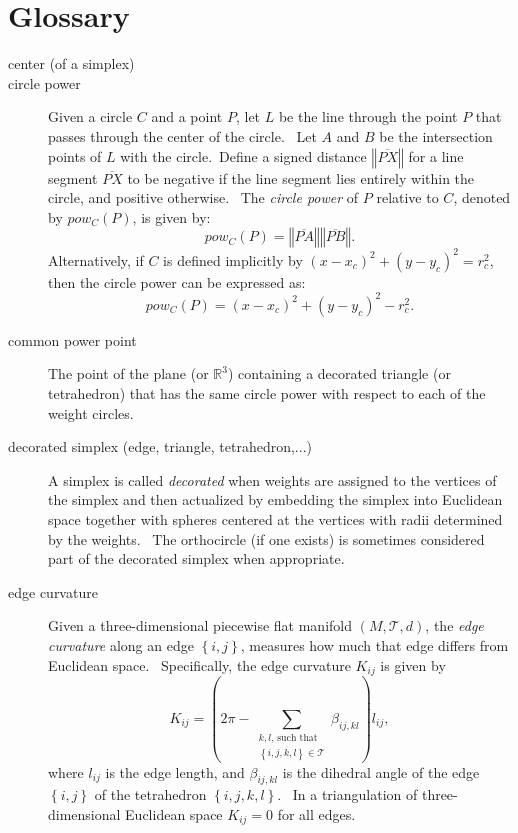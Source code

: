                       


\chapter{Glossary}

\begin{description}
\item[center (of a simplex)] 

\item[circle power] Given a circle $C$ and a point $P$, let $L$ be the line
through the point $P$ that passes through the center of the circle. \ Let $A$
and $B$ be the intersection points of $L$ with the circle.\ Define a signed
distance $\left\Vert \overline{PX}\right\Vert $ for a line segment $%
\overline{PX}$ to be negative if the line segment lies entirely within the
circle, and positive otherwise. \ The \textit{circle power} of $P$ relative
to $C$, denoted by $pow_{C}\left( P\right) $, is given by:%
\[
pow_{C}\left( P\right) =\left\Vert \overline{PA}\right\Vert \left\Vert 
\overline{PB}\right\Vert .
\]%
Alternatively, if $C$ is defined implicitly by $\left( x-x_{c}\right)
^{2}+\left( y-y_{c}\right) ^{2}=r_{c}^{2}$, then the circle power can be
expressed as:%
\[
pow_{C}\left( P\right) =\left( x-x_{c}\right) ^{2}+\left( y-y_{c}\right)
^{2}-r_{c}^{2}.
\]

\item[common power point] The point of the plane (or $%
\mathbb{R}
^{3}$) containing a decorated triangle (or tetrahedron) that has the same
circle power with respect to each of the weight circles. \ 

\item[decorated simplex (edge, triangle, tetrahedron,...)] A simplex is
called \textit{decorated} when weights are assigned to the vertices of the
simplex and then actualized by embedding the simplex into Euclidean space
together with spheres centered at the vertices with radii determined by the
weights. \ The orthocircle (if one exists) is sometimes considered part of
the decorated simplex when appropriate.

\item[edge curvature] Given a three-dimensional piecewise flat manifold $%
\left( M,\mathcal{T},d\right) $, the \textit{edge curvature} along an edge $%
\left\{ i,j\right\} $, measures how much that edge differs from Euclidean
space. \ Specifically, the edge curvature $K_{ij}$ is given by 
\[
K_{ij}=\left( 2\pi -\sum\limits_{\substack{ k,l\text{, such that} \\ \left\{
i,j,k,l\right\} \in \mathcal{T}}}\beta _{ij,kl}\right) l_{ij},
\]%
where $l_{ij}$ is the edge length, and $\beta _{ij,kl}$ is the dihedral
angle of the edge $\left\{ i,j\right\} $ of the tetrahedron $\left\{
i,j,k,l\right\} $. \ In a triangulation of three-dimensional Euclidean space 
$K_{ij}=0$ for all edges. \ 


\end{description}
